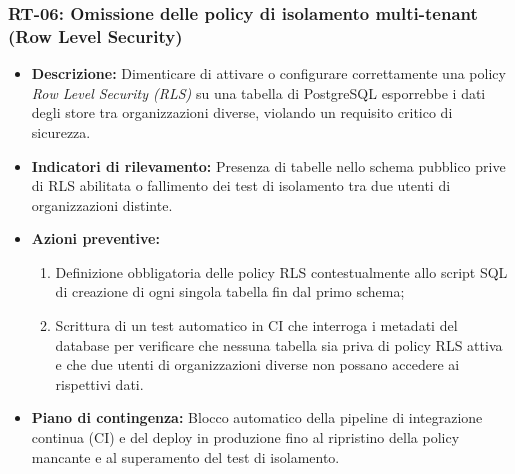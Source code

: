 \subsubsection{RT-06: Omissione delle policy di isolamento multi-tenant (Row Level Security)}
\begin{itemize}
    \item \textbf{Descrizione:} Dimenticare di attivare o configurare correttamente una policy \textit{Row Level Security (RLS)} su una tabella di PostgreSQL esporrebbe i dati degli store tra organizzazioni diverse, violando un requisito critico di sicurezza.
    \item \textbf{Indicatori di rilevamento:} Presenza di tabelle nello schema pubblico prive di RLS abilitata o fallimento dei test di isolamento tra due utenti di organizzazioni distinte.
    \item \textbf{Azioni preventive:}
    \begin{enumerate}
        \item Definizione obbligatoria delle policy RLS contestualmente allo script SQL di creazione di ogni singola tabella fin dal primo schema;
        \item Scrittura di un test automatico in CI che interroga i metadati del database per verificare che nessuna tabella sia priva di policy RLS attiva e che due utenti di organizzazioni diverse non possano accedere ai rispettivi dati.
    \end{enumerate}
    \item \textbf{Piano di contingenza:} Blocco automatico della pipeline di integrazione continua (CI) e del deploy in produzione fino al ripristino della policy mancante e al superamento del test di isolamento.
\end{itemize}

